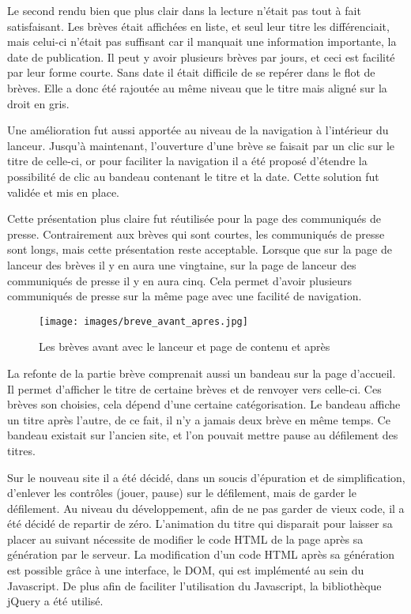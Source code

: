 \documentclass[12pt,a4paper]{article}
\begin{document}
\medskip
Le second rendu bien que plus clair dans la lecture n'était pas tout à fait satisfaisant. Les brèves était affichées en liste, et seul leur titre les différenciait, mais celui-ci n'était pas suffisant car il manquait une information importante, la date de publication. Il peut y avoir plusieurs brèves par jours, et ceci est facilité par leur forme courte. Sans date il était difficile de se repérer dans le flot de brèves. Elle a donc été rajoutée au même niveau que le titre mais aligné sur la droit en gris.\par
Une amélioration fut aussi apportée au niveau de la navigation à l'intérieur du lanceur. Jusqu'à maintenant, l'ouverture d'une brève se faisait par un clic sur le titre de celle-ci, or pour faciliter la navigation il a été proposé d'étendre la possibilité de clic au bandeau contenant le titre et la date. Cette solution fut validée et mis en place.\par
\medskip
Cette présentation plus claire fut réutilisée pour la page des communiqués de presse. Contrairement aux brèves qui sont courtes, les communiqués de presse sont longs, mais cette présentation reste acceptable. Lorsque que sur la page de lanceur des brèves il y en aura une vingtaine, sur la page de lanceur des communiqués de presse il y en aura cinq. Cela permet d'avoir plusieurs communiqués de presse sur la même page avec une facilité de navigation.\par
\begin{figure}[h!]
\centering\texttt{[image: images/breve\_avant\_apres.jpg]} 
\caption{Les brèves avant avec le lanceur et page de contenu et après}
\end{figure}
\bigskip 
La refonte de la partie brève comprenait aussi un bandeau sur la page d'accueil. Il permet d'afficher le titre de certaine brèves et de renvoyer vers celle-ci. Ces brèves son choisies, cela dépend d'une certaine catégorisation. Le bandeau affiche un titre après l'autre, de ce fait, il n'y a jamais deux brève en même temps. Ce bandeau existait sur l'ancien site, et l'on pouvait mettre pause au défilement des titres.\par 
Sur le nouveau site il a été décidé, dans un soucis d'épuration et de simplification, d'enlever les contrôles (jouer, pause) sur le défilement, mais de garder le défilement. Au niveau du développement, afin de ne pas garder de vieux code, il a été décidé de repartir de zéro. L'animation du titre qui disparait pour laisser sa placer au suivant nécessite de modifier le code HTML de la page après sa génération par le serveur. La modification d'un code HTML après sa génération est possible grâce à une interface, le DOM, qui est implémenté au sein du Javascript. De plus afin de faciliter l'utilisation du Javascript, la bibliothèque jQuery a été utilisé.\par 
\end{document}
